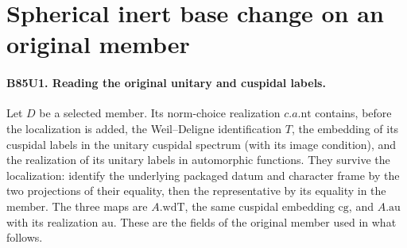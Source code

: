 \section{Spherical inert base change on an original member}

\paragraph{B85U1. Reading the original unitary and cuspidal labels.}
Let $D$ be a selected member. Its norm-choice realization
$c.a.\mathrm{nt}$ contains, before the localization is added, the
Weil--Deligne identification $T$, the embedding of its cuspidal
labels in the unitary cuspidal spectrum (with its image condition),
and the realization of its unitary labels in automorphic functions.
They survive the localization: identify the underlying packaged
datum and character frame by the two projections of their equality,
then the representative by its equality in the member. The three
maps are $A.\mathrm{wdT}$, the same cuspidal embedding $\mathrm{cg}$,
and $A.\mathrm{au}$ with its realization $\mathrm{au}$.
These are the fields of the original member used in what follows.

